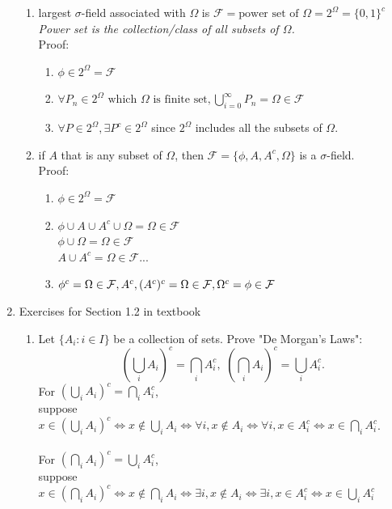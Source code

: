\documentclass[11pt]{article}
\begin{document}
\begin{enumerate}
\begin{enumerate}
\item largest $\sigma$-field associated with $\Omega$ is $\mathcal{F}= \text{power set of }\Omega = 2^{\Omega} = \{0, 1\}^{c}$\\
\textit{Power set is the collection/class of all subsets of $\Omega$.}\\
Proof:\begin{enumerate}
\item $\phi \in 2^{\Omega} = \mathcal{F}$
\item $\forall P_{n} \in 2^{\Omega} \text{ which }\Omega \text{ is finite set}, \bigcup\limits_{i=0}^{\infty} P_{n} = \Omega \in \mathcal{F}$
\item $\forall P \in 2^{\Omega}, \exists P^{c} \in 2^{\Omega}$ since $2^{\Omega}$ includes all the subsets of $\Omega$.
\end{enumerate}
\item if $A$ that is any subset of $\Omega$, then $\mathcal{F} = \{ \phi, A, A^{c}, \Omega \}$ is a $\sigma$-field.\\
Proof: \begin{enumerate}
\item $\phi \in 2^{\Omega} = \mathcal{F}$
\item $\phi \cup A \cup A^{c} \cup \Omega = \Omega \in \mathcal{F}$\\
$\phi \cup \Omega = \Omega \in \mathcal{F}$\\
$A \cup A^c = \Omega \in \mathcal{F}$...
\item $\phi ^{c} = \Omega \in \mathcal{F}, \\
A^{c}, (A^{c})^{c} = \Omega \in \mathcal{F},\\
\Omega ^{c} = \phi \in \mathcal{F}$
\end{enumerate}
\end{enumerate}

\item Exercises for Section 1.2 in textbook
\begin{enumerate}
\item Let $\{A_i : i \in I\}$  be a collection of sets. Prove "De Morgan's Laws": 
$$(\bigcup_i A_i)^c = \bigcap_i A_i ^c,\,\, (\bigcap_i A_i)^c = \bigcup_i A_i ^c .$$
For $(\bigcup_i A_i)^c = \bigcap_i A_i ^c$, \\
suppose $x \in (\bigcup_i A_i)^c \iff x \notin \bigcup_i A_i \iff \forall i, x \notin A_i  \iff \forall i,  x \in A_i ^c \iff x \in \bigcap_i A_i ^c$.\\\\
For $(\bigcap_i A_i)^c = \bigcup_i A_i ^c$,\\
suppose $x \in (\bigcap_i A_i)^c \iff x \notin \bigcap_i A_i \iff \exists i, x \notin A_i \iff \exists i, x \in A_i ^c \iff x \in \bigcup_i A_i ^c$


\end{enumerate}
\end{enumerate}
\end{document}
